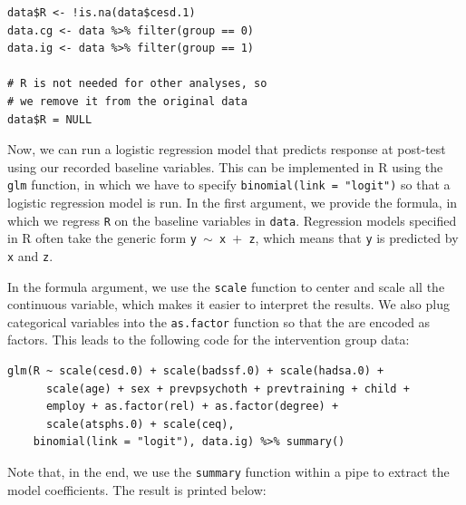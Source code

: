 \begin{lstlisting}
data$R <- !is.na(data$cesd.1)
data.cg <- data %>% filter(group == 0)
data.ig <- data %>% filter(group == 1)

# R is not needed for other analyses, so
# we remove it from the original data
data$R = NULL 
\end{lstlisting}

Now, we can run a logistic regression model that predicts response at post-test using our recorded baseline variables. This can be implemented in \textsf{R} using the \texttt{glm} function, in which we have to specify \texttt{binomial(link = "logit")} so that a logistic regression model is run. In the first argument, we provide the formula, in which we regress \texttt{R} on the baseline variables in \texttt{data}. Regression models specified in \textsf{R} often take the generic form \texttt{y $\sim$ x $+$ z}, which means that \texttt{y} is predicted by \texttt{x} and \texttt{z}. 

In the formula argument, we use the \texttt{scale} function to center and scale all the continuous variable, which makes it easier to interpret the results. We also plug categorical variables into the \texttt{as.factor} function so that the are encoded as factors. This leads to the following code for the intervention group data:

\begin{lstlisting}
glm(R ~ scale(cesd.0) + scale(badssf.0) + scale(hadsa.0) +
      scale(age) + sex + prevpsychoth + prevtraining + child + 
      employ + as.factor(rel) + as.factor(degree) + 
      scale(atsphs.0) + scale(ceq), 
    binomial(link = "logit"), data.ig) %>% summary()
\end{lstlisting}

Note that, in the end, we use the \texttt{summary} function within a pipe to extract the model coefficients. The result is printed below:

